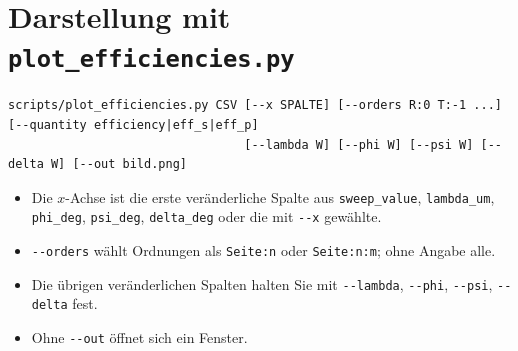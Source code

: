 \section{Darstellung mit \texttt{plot\_efficiencies.py}}
\begin{lstlisting}[style=shell]
scripts/plot_efficiencies.py CSV [--x SPALTE] [--orders R:0 T:-1 ...] [--quantity efficiency|eff_s|eff_p]
                                 [--lambda W] [--phi W] [--psi W] [--delta W] [--out bild.png]
\end{lstlisting}
\begin{itemize}
  \item Die $x$-Achse ist die erste veränderliche Spalte aus \texttt{sweep\_value}, \texttt{lambda\_um},
        \texttt{phi\_deg}, \texttt{psi\_deg}, \texttt{delta\_deg} oder die mit \texttt{-{}-x} gewählte.
  \item \texttt{-{}-orders} wählt Ordnungen als \texttt{Seite:n} oder \texttt{Seite:n:m}; ohne Angabe alle.
  \item Die übrigen veränderlichen Spalten halten Sie mit \texttt{-{}-lambda}, \texttt{-{}-phi}, \texttt{-{}-psi},
        \texttt{-{}-delta} fest.
  \item Ohne \texttt{-{}-out} öffnet sich ein Fenster.
\end{itemize}
